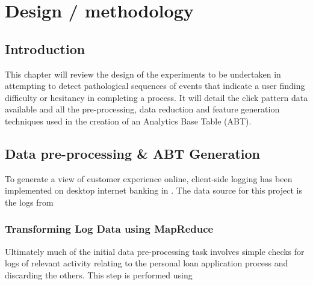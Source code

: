 
\chapter{Design / methodology} %

\label{Chapter3} %


\section{Introduction}

This chapter will review the design of the experiments to be undertaken in attempting to detect pathological sequences of events that indicate a user finding difficulty or hesitancy in completing a process. It will detail the click pattern data available and all the pre-processing, data reduction and feature generation techniques used in the creation of an Analytics Base Table (ABT).


\section{Data pre-processing \& ABT Generation}
To generate a view of customer experience online, client-side logging has been implemented on desktop internet banking in \subjectname. The data source for this project is the logs from


\subsection{Transforming Log Data using MapReduce}
Ultimately much of the initial data pre-processing task involves simple checks for logs of relevant activity relating to the personal loan application process and discarding the others. This step is performed using 


